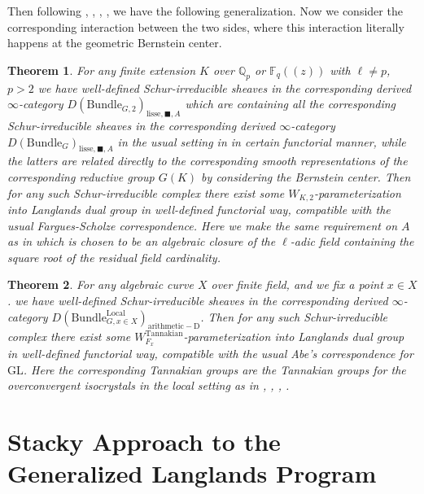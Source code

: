 \documentclass[12pt]{book}
\newtheorem{theorem}{Theorem}
\theoremstyle{definition}
\begin{document}
\indent Then following \cite{VLa}, \cite{FS}, \cite{AI}, \cite{KI}, \cite{KXII} we have the following generalization. Now we consider the corresponding interaction between the two sides, where this interaction literally happens at the geometric Bernstein center.

\begin{theorem}
For any finite extension $K$ over $\mathbb{Q}_p$ or $\mathbb{F}_q((z))$ with $\ell\neq p$, $p>2$ we have well-defined Schur-irreducible sheaves in the corresponding derived $\infty$-category $D(\mathrm{Bundle}_{G,2})_{\text{lisse},\blacksquare,A}$ which are containing all the corresponding Schur-irreducible sheaves in the corresponding derived $\infty$-category $D(\mathrm{Bundle}_{G})_{\text{lisse},\blacksquare,A}$ in the usual setting in \cite{FS} in certain functorial manner, while the latters are related directly to the corresponding smooth representations of the corresponding reductive group $G(K)$ by considering the Bernstein center. Then for any such Schur-irreducible complex there exist some $W_{K,2}$-parameterization into Langlands dual group in well-defined functorial way, compatible with the usual Fargues-Scholze correspondence. Here we make the same requirement on $A$ as in \cite{FS} which is chosen to be an algebraic closure of the $\ell$-adic field containing the square root of the residual field cardinality.
\end{theorem}

\begin{theorem}
For any algebraic curve $X$ over finite field, and we fix a point $x\in X$. we have well-defined Schur-irreducible sheaves in the corresponding derived $\infty$-category $D(\mathrm{Bundle}^\mathrm{Local}_{G,x\in X})_{\mathrm{arithmetic-D}}$. Then for any such Schur-irreducible complex there exist some $W^\mathrm{Tannakian}_{F_x}$-parameterization into Langlands dual group in well-defined functorial way, compatible with the usual Abe's correspondence for $\mathrm{GL}$. Here the corresponding Tannakian groups are the Tannakian groups for the overconvergent isocrystals in the local setting as in \cite{AI}, \cite{KI}, \cite{KXII}, \cite{DK}.
\end{theorem}








\chapter{Stacky Approach to the Generalized Langlands Program}
\end{document}
